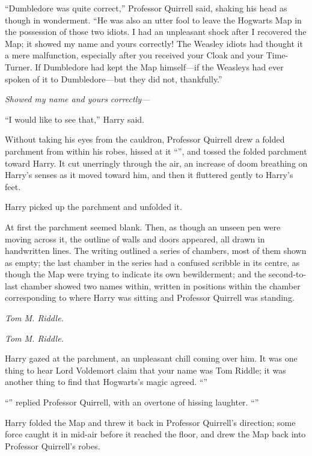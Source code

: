 “Dumbledore was quite correct,” Professor Quirrell said, shaking his head as though in wonderment. “He was also an utter fool to leave the Hogwarts Map in the possession of those two idiots. I had an unpleasant shock after I recovered the Map; it showed my name and yours correctly! The Weasley idiots had thought it a mere malfunction, especially after you received your Cloak and your Time-Turner. If Dumbledore had kept the Map himself—if the Weasleys had ever spoken of it to Dumbledore—but they did not, thankfully.”

\emph{Showed my name and yours correctly—}

“I would like to see that,” Harry said.

Without taking his eyes from the cauldron, Professor Quirrell drew a folded parchment from within his robes, hissed at it “”, and tossed the folded parchment toward Harry. It cut unerringly through the air, an increase of doom breathing on Harry’s senses as it moved toward him, and then it fluttered gently to Harry’s feet.

Harry picked up the parchment and unfolded it.

At first the parchment seemed blank. Then, as though an unseen pen were moving across it, the outline of walls and doors appeared, all drawn in handwritten lines. The writing outlined a series of chambers, most of them shown as empty; the last chamber in the series had a confused scribble in its centre, as though the Map were trying to indicate its own bewilderment; and the second-to-last chamber showed two names within, written in positions within the chamber corresponding to where Harry was sitting and Professor Quirrell was standing.

\emph{Tom M. Riddle.}

\emph{Tom M. Riddle.}

Harry gazed at the parchment, an unpleasant chill coming over him. It was one thing to hear Lord Voldemort claim that your name was Tom Riddle; it was another thing to find that Hogwarts’s magic agreed. “”

“” replied Professor Quirrell, with an overtone of hissing laughter. “”

Harry folded the Map and threw it back in Professor Quirrell’s direction; some force caught it in mid-air before it reached the floor, and drew the Map back into Professor Quirrell’s robes.

